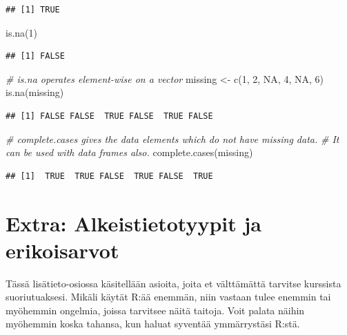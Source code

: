 \documentclass[
]{book}
\newenvironment{Shaded}{\begin{snugshade}}{\end{snugshade}}
\newcommand{\CommentTok}[1]{\textcolor[rgb]{0.56,0.35,0.01}{\textit{#1}}}
\newcommand{\ConstantTok}[1]{\textcolor[rgb]{0.00,0.00,0.00}{#1}}
\newcommand{\DecValTok}[1]{\textcolor[rgb]{0.00,0.00,0.81}{#1}}
\newcommand{\FunctionTok}[1]{\textcolor[rgb]{0.00,0.00,0.00}{#1}}
\newcommand{\NormalTok}[1]{#1}
\newcommand{\OtherTok}[1]{\textcolor[rgb]{0.56,0.35,0.01}{#1}}
\begin{document}
\begin{verbatim}
## [1] TRUE
\end{verbatim}

\begin{Shaded}
\begin{Highlighting}[]
\FunctionTok{is.na}\NormalTok{(}\DecValTok{1}\NormalTok{)}
\end{Highlighting}
\end{Shaded}

\begin{verbatim}
## [1] FALSE
\end{verbatim}

\begin{Shaded}
\begin{Highlighting}[]
\CommentTok{\# is.na operates element{-}wise on a vector}
\NormalTok{missing }\OtherTok{\textless{}{-}} \FunctionTok{c}\NormalTok{(}\DecValTok{1}\NormalTok{, }\DecValTok{2}\NormalTok{, }\ConstantTok{NA}\NormalTok{, }\DecValTok{4}\NormalTok{, }\ConstantTok{NA}\NormalTok{, }\DecValTok{6}\NormalTok{)}
\FunctionTok{is.na}\NormalTok{(missing)}
\end{Highlighting}
\end{Shaded}

\begin{verbatim}
## [1] FALSE FALSE  TRUE FALSE  TRUE FALSE
\end{verbatim}

\begin{Shaded}
\begin{Highlighting}[]
\CommentTok{\# complete.cases gives the data elements which do not have missing data. }
\CommentTok{\# It can be used with data frames also.}
\FunctionTok{complete.cases}\NormalTok{(missing)}
\end{Highlighting}
\end{Shaded}

\begin{verbatim}
## [1]  TRUE  TRUE FALSE  TRUE FALSE  TRUE
\end{verbatim}

\hypertarget{extra}{%
\section{Extra: Alkeistietotyypit ja erikoisarvot}\label{extra}}

Tässä lisätieto-osiossa käsitellään asioita, joita et välttämättä tarvitse kurssista suoriutuaksesi. Mikäli käytät R:ää enemmän, niin vastaan tulee enemmin tai myöhemmin ongelmia, joissa tarvitsee näitä taitoja. Voit palata näihin myöhemmin koska tahansa, kun haluat syventää ymmärrystäsi R:stä.
\end{document}
